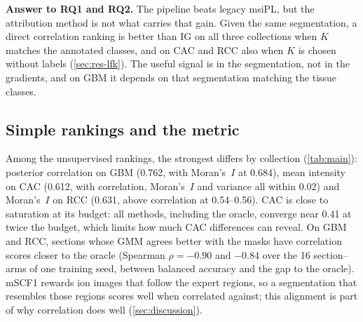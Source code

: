 \textbf{Answer to RQ1 and RQ2.} The pipeline beats legacy msiPL, but the
attribution method is not what carries that gain. Given the same segmentation,
a direct correlation ranking is better than IG on all three collections when
$K$ matches the annotated classes, and on CAC and RCC also when $K$ is chosen
without labels (\cref{sec:res-lfk}). The useful signal is in the segmentation,
not in the gradients, and on GBM it depends on that segmentation matching the
tissue classes.

\subsection{Simple rankings and the metric}
\label{sec:res-simple}
Among the unsupervised rankings, the strongest differs by collection
(\cref{tab:main}): posterior correlation on GBM (0.762, with Moran's~$I$ at
0.684), mean intensity on CAC (0.612, with correlation, Moran's~$I$ and
variance all within 0.02) and Moran's~$I$ on RCC (0.631, above correlation at
0.54--0.56). CAC is close to saturation at its budget: all methods, including
the oracle, converge near 0.41 at twice the budget, which limits how much CAC
differences can reveal. On GBM and RCC, sections whose GMM agrees better with
the masks have correlation scores closer to the oracle (Spearman $\rho=-0.90$
and $-0.84$ over the 16 section--arms of one training seed, between balanced accuracy and the gap to the
oracle). mSCF1 rewards ion images that
follow the expert regions, so a segmentation that resembles those regions
scores well when correlated against; this alignment is part of why correlation
does well (\cref{sec:discussion}).

